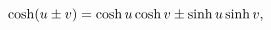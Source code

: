 \[\mathop{\cosh\/}\nolimits\!\left(u\pm v\right)=\mathop{\cosh\/}\nolimits u%
\mathop{\cosh\/}\nolimits v\pm\mathop{\sinh\/}\nolimits u\mathop{\sinh\/}%
\nolimits v,\]